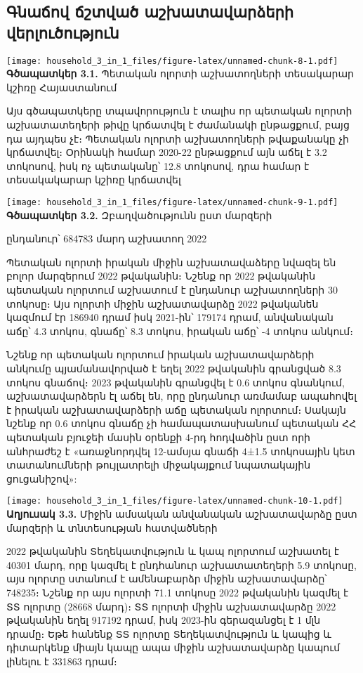 \documentclass[
]{article}
\begin{document}
\subsection{Գնաճով ճշտված աշխատավարձերի
վերլուծություն}\label{ux563ux576ux561ux573ux578ux57e-ux573ux577ux57fux57eux561ux56e-ux561ux577ux56dux561ux57fux561ux57eux561ux580ux571ux565ux580ux56b-ux57eux565ux580ux56cux578ux582ux56eux578ux582ux569ux575ux578ux582ux576}

\texttt{[image: household\_3\_in\_1\_files/figure-latex/unnamed-chunk-8-1.pdf]}
\textbf{Գծապատկեր 3.1.} Պետական ոլորտի աշխատողների տեսակարար կշիռը
Հայաստանում

Այս գծապատկերը տպավորություն է տալիս որ պետական ոլորտի աշխատատեղերի թիվը
կրճատվել է ժամանակի ընթացքում, բայց դա այդպես չէ։ Պետական ոլորտի
աշխատողների թվաքանակը չի կրճատվել։ Օրինակի համար 2020-22 ընթացքում այն
աճել է 3.2 տոկոսով, իսկ ոչ պետականը՝ 12.8 տոկոսով, դրա համար է
տեսակակարար կշիռը կրճատվել

\texttt{[image: household\_3\_in\_1\_files/figure-latex/unnamed-chunk-9-1.pdf]}
\textbf{Գծապատկեր 3.2.} Զբաղվածությունն ըստ մարզերի

ընդանուր՝ 684783 մարդ աշխատող 2022

Պետական ոլորտի իրական միջին աշխատավաձերը նվազել են բոլոր մարզերում 2022
թվականին։ Նշենք որ 2022 թվականին պետական ոլորտում աշխատում է ընդանուր
աշխատողների 30 տոկոսը։ Այս ոլորտի միջին աշխատավարձը 2022 թվականեն
կազմում էր 186940 դրամ իսկ 2021-ին՝ 179174 դրամ, անվանական աճը՝ 4.3
տոկոս, գնաճը՝ 8.3 տոկոս, իրական աճը՝ -4 տոկոս անկում։

Նշենք որ պետական ոլորտում իրական աշխատավարձերի անկումը պյամանավորված է
եղել 2022 թվականին գրանցված 8.3 տոկոս գնաճով։ 2023 թվականին գրանցվել է
0.6 տոկոս գնանկում, աշխատավարձերն էլ աճել են, որը ընդանուր առմամաբ
ապահովել է իրական աշխատավարձերի աճը պետական ոլորտում։ Սակայն նշենք որ
0.6 տոկոս գնաճը չի համապատասխանում պետական ՀՀ պետական բյուջեի մասին
օրենքի 4-րդ հոդվածին ըստ որի անհրաժեշ է «առաջնորդվել 12-ամսյա գնաճի
4±1.5 տոկոսային կետ տատանումների թույլատրելի միջակայքում նպատակային
ցուցանիշով»:

\texttt{[image: household\_3\_in\_1\_files/figure-latex/unnamed-chunk-10-1.pdf]}
\textbf{Աղյուսակ 3.3.} Միջին ամսական անվանական աշխատավարձը ըստ մարզերի և
տնտեսության հատվածների

2022 թվականին Տեղեկատվություն և կապ ոլորտում աշխատել է 40301 մարդ, որը
կազմել է ընդհանուր աշխատատեղերի 5.9 տոկոսը, այս ոլորտը ստանում է
ամենաբարձր միջին աշխատավարձը՝ 748235։ Նշենք որ այս ոլորտի 71.1 տոկոսը
2022 թվականին կազմել է ՏՏ ոլորտը (28668 մարդ)։ ՏՏ ոլորտի միջին
աշխատավարձը 2022 թվականին եղել 917192 դրամ, իսկ 2023-ին գերազանցել է 1
մլն դրամը։ Եթե հանենք ՏՏ ոլորտը Տեղեկատվություն և կապից և դիտարկենք
միայն կապը ապա միջին աշխատավարձը կապում լինելու է 331863 դրամ։
\end{document}
